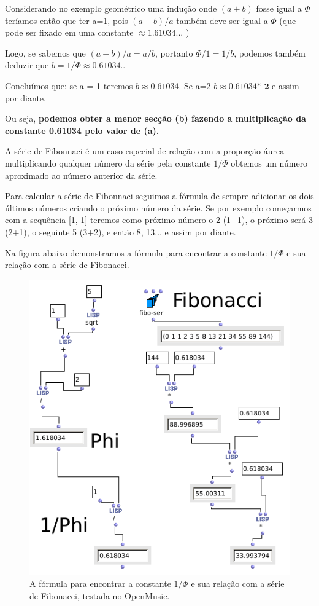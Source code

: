 \documentclass[
	12pt,				%
	openright,			%
	twoside,			%
	a4paper,			%
	english,			%
	french,				%
	spanish,			%
	brazil				%
	]{abntex2}
\begin{document}
Considerando no exemplo geométrico uma indução onde $(a+b)$ fosse igual a $\Phi$ teríamos então que ter a=1, pois $(a+b)/a$ também deve ser igual a $\Phi$ (que pode ser fixado em uma constante  $ \approx 1.61034... $ ) 

Logo, se sabemos que $(a+b)/a = a/b $, portanto $\Phi/1 = 1/b$, podemos também deduzir que $b = 1/\Phi \approx 0.61034.. $ 

Concluímos que: se a = 1 teremos $b \approx 0.61034 $. Se a=2 $b \approx 0.61034 \textbf{* 2} $ e assim por diante.

Ou seja, \textbf{podemos obter a menor secção (b) fazendo a multiplicação da constante 0.61034 pelo valor de (a).}

A série de Fibonnaci é um caso especial de relação com a proporção áurea - multiplicando qualquer número da série pela constante $1/\Phi$ obtemos um número aproximado ao número anterior da série.

Para calcular a série de Fibonnaci seguimos a fórmula de sempre adicionar os dois últimos números criando o próximo número da série. Se por exemplo começarmos com a sequência [1, 1] teremos como próximo número o 2 (1+1), o próximo será 3 (2+1), o seguinte 5 (3+2), e então 8, 13... e assim por diante. 

Na figura abaixo demonstramos a fórmula para encontrar a constante $1/\Phi$ e sua relação com a série de Fibonacci.

\begin{figure}[!h]
	\caption{\label{fig_grafico}A fórmula para encontrar a constante $1/\Phi$ e sua relação com a série de Fibonacci, testada no OpenMusic. }
	\begin{center}
	    \includegraphics[scale=0.45]{OM_settheory/aurea.png}
	\end{center}
\end{figure}	
\end{document}
